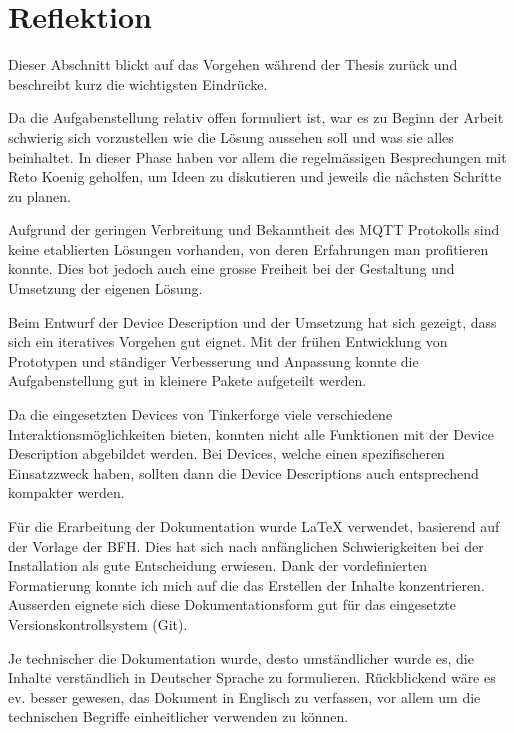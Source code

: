 \section{Reflektion}

Dieser Abschnitt blickt auf das Vorgehen während der Thesis zurück und beschreibt kurz die wichtigsten Eindrücke.

Da die Aufgabenstellung relativ offen formuliert ist, war es zu Beginn der Arbeit schwierig sich vorzustellen wie die Lösung aussehen soll und was sie alles beinhaltet. In dieser Phase haben vor allem die regelmässigen Besprechungen mit Reto Koenig geholfen, um Ideen zu diskutieren und jeweils die nächsten Schritte zu planen.

Aufgrund der geringen Verbreitung und Bekanntheit des MQTT Protokolls sind keine etablierten Lösungen vorhanden, von deren Erfahrungen man profitieren konnte. Dies bot jedoch auch eine grosse Freiheit bei der Gestaltung und Umsetzung der eigenen Lösung.

Beim Entwurf der Device Description und der Umsetzung hat sich gezeigt, dass sich ein iteratives Vorgehen   gut eignet. Mit der frühen Entwicklung von Prototypen und ständiger Verbesserung und Anpassung konnte die Aufgabenstellung gut in kleinere Pakete aufgeteilt werden.

Da die eingesetzten Devices von Tinkerforge viele verschiedene Interaktionsmöglichkeiten bieten, konnten nicht alle Funktionen mit der Device Description abgebildet werden. Bei Devices, welche einen spezifischeren Einsatzzweck haben, sollten dann die Device Descriptions auch entsprechend kompakter werden.


Für die Erarbeitung der Dokumentation wurde LaTeX verwendet, basierend auf der Vorlage der BFH. Dies hat sich nach anfänglichen Schwierigkeiten bei der Installation als gute Entscheidung erwiesen. Dank der vordefinierten Formatierung konnte ich mich auf die das Erstellen der Inhalte konzentrieren. Ausserden eignete sich diese Dokumentationsform gut für das eingesetzte Versionskontrollsystem (Git).

Je technischer die Dokumentation wurde, desto umständlicher wurde es, die Inhalte verständlich in Deutscher Sprache zu formulieren. Rückblickend wäre es ev. besser gewesen, das Dokument in Englisch zu verfassen, vor allem um die technischen Begriffe einheitlicher verwenden zu können.
